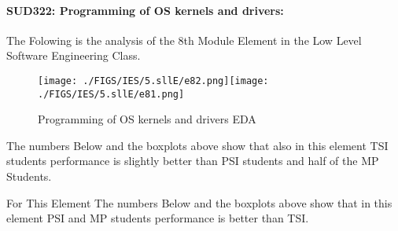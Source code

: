 \documentclass[12pt]{extreport}
\begin{document}

\paragraph{\large SUD322: Programming of OS kernels and drivers:\\
} 
The Folowing is the analysis of the 8th Module Element in the Low Level Software Engineering Class.

\begin{figure}[H]
	\centering
	\texttt{[image: ./FIGS/IES/5.sllE/e82.png]}\texttt{[image: ./FIGS/IES/5.sllE/e81.png]}
	\caption{Programming of OS kernels and drivers EDA}
	\label{fig:68}
\end{figure}

The numbers Below and the boxplots above show that also in this element  TSI students performance is slightly better than PSI students and half of the MP Students.

For This Element The numbers Below and the boxplots above show that in this element  PSI and MP students performance is  better than TSI.
\end{document}

